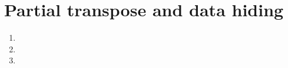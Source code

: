 \documentclass[12pt]{article}
\begin{document}
\pagebreak

\section{Partial transpose and data hiding}

\begin{enumerate}

\item

\item

\item

\end{enumerate}
\end{document}
